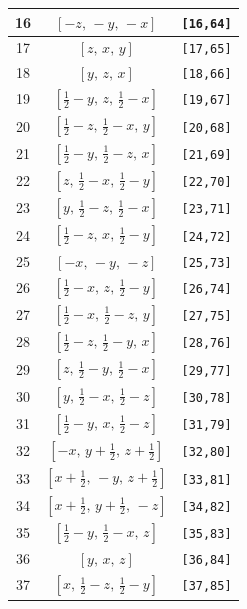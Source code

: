 \documentclass[fleqn,8pt]{jsarticle}
\begin{document}
\begin{longtable}{ccc}
16 & $\left[ - z,\, - y,\, - x \right]$ & {\tt [16,64]} \\ \hline
17 & $\left[ z,\, x,\, y \right]$ & {\tt [17,65]} \\ \hline
18 & $\left[ y,\, z,\, x \right]$ & {\tt [18,66]} \\ \hline
19 & $\left[ \frac{1}{2} - y,\, z,\, \frac{1}{2} - x \right]$ & {\tt [19,67]} \\ \hline
20 & $\left[ \frac{1}{2} - z,\, \frac{1}{2} - x,\, y \right]$ & {\tt [20,68]} \\ \hline
21 & $\left[ \frac{1}{2} - y,\, \frac{1}{2} - z,\, x \right]$ & {\tt [21,69]} \\ \hline
22 & $\left[ z,\, \frac{1}{2} - x,\, \frac{1}{2} - y \right]$ & {\tt [22,70]} \\ \hline
23 & $\left[ y,\, \frac{1}{2} - z,\, \frac{1}{2} - x \right]$ & {\tt [23,71]} \\ \hline
24 & $\left[ \frac{1}{2} - z,\, x,\, \frac{1}{2} - y \right]$ & {\tt [24,72]} \\ \hline
25 & $\left[ - x,\, - y,\, - z \right]$ & {\tt [25,73]} \\ \hline
26 & $\left[ \frac{1}{2} - x,\, z,\, \frac{1}{2} - y \right]$ & {\tt [26,74]} \\ \hline
27 & $\left[ \frac{1}{2} - x,\, \frac{1}{2} - z,\, y \right]$ & {\tt [27,75]} \\ \hline
28 & $\left[ \frac{1}{2} - z,\, \frac{1}{2} - y,\, x \right]$ & {\tt [28,76]} \\ \hline
29 & $\left[ z,\, \frac{1}{2} - y,\, \frac{1}{2} - x \right]$ & {\tt [29,77]} \\ \hline
30 & $\left[ y,\, \frac{1}{2} - x,\, \frac{1}{2} - z \right]$ & {\tt [30,78]} \\ \hline
31 & $\left[ \frac{1}{2} - y,\, x,\, \frac{1}{2} - z \right]$ & {\tt [31,79]} \\ \hline
32 & $\left[ - x,\, y + \frac{1}{2},\, z + \frac{1}{2} \right]$ & {\tt [32,80]} \\ \hline
33 & $\left[ x + \frac{1}{2},\, - y,\, z + \frac{1}{2} \right]$ & {\tt [33,81]} \\ \hline
34 & $\left[ x + \frac{1}{2},\, y + \frac{1}{2},\, - z \right]$ & {\tt [34,82]} \\ \hline
35 & $\left[ \frac{1}{2} - y,\, \frac{1}{2} - x,\, z \right]$ & {\tt [35,83]} \\ \hline
36 & $\left[ y,\, x,\, z \right]$ & {\tt [36,84]} \\ \hline
37 & $\left[ x,\, \frac{1}{2} - z,\, \frac{1}{2} - y \right]$ & {\tt [37,85]} \\ \hline

\end{longtable}
\end{document}
